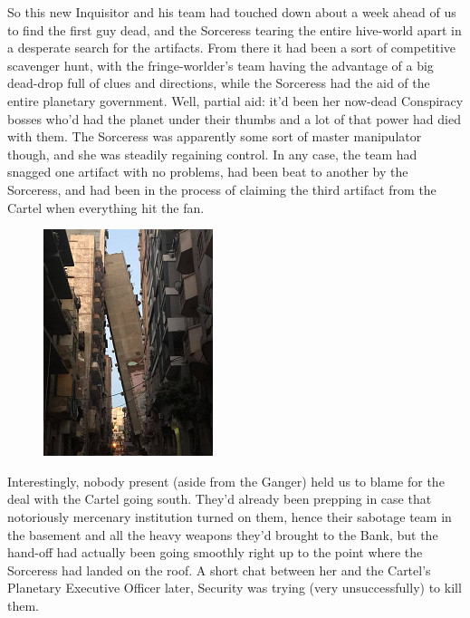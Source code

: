 So this new Inquisitor and his team had touched down about a week ahead of us to find the first guy dead, and the Sorceress tearing the entire hive-world apart in a desperate search for the artifacts. 
From there it had been a sort of competitive scavenger hunt, with the fringe-worlder's team having the advantage of a big dead-drop full of clues and directions, while the Sorceress had the aid of the entire planetary government. 
Well, partial aid: 
it'd been her now-dead Conspiracy bosses who'd had the planet under their thumbs and a lot of that power had died with them. 
The Sorceress was apparently some sort of master manipulator though, and she was steadily regaining control. 
In any case, the team had snagged one artifact with no problems, had been beat to another by the Sorceress, and had been in the process of claiming the third artifact from the Cartel when everything hit the fan.

\begin{figure}
	\begin{center}
		\includegraphics[width=\figwidth]{pics/18/41.png}
	\end{center}
\end{figure}
Interestingly, nobody present (aside from the Ganger) held us to blame for the deal with the Cartel going south. 
They'd already been prepping in case that notoriously mercenary institution turned on them, hence their sabotage team in the basement and all the heavy weapons they'd brought to the Bank, but the hand-off had actually been going smoothly right up to the point where the Sorceress had landed on the roof. 
A short chat between her and the Cartel's Planetary Executive Officer later, Security was trying (very unsuccessfully) to kill them.

